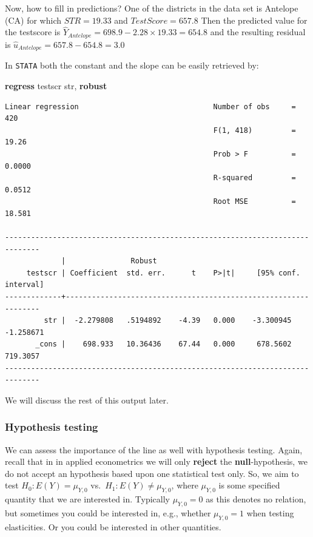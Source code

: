 \documentclass[
]{book}
\newenvironment{Shaded}{\begin{snugshade}}{\end{snugshade}}
\newcommand{\KeywordTok}[1]{\textcolor[rgb]{0.13,0.29,0.53}{\textbf{#1}}}
\newcommand{\NormalTok}[1]{#1}
\begin{document}
Now, how to fill in predictions? One of the districts in the data set is Antelope (CA) for which \(STR = 19.33\) and \(TestScore = 657.8\) Then the predicted value for the testscore is \(\hat{Y}_{Antelope}= 698.9 - 2.28 \times 19.33 = 654.8\) and the resulting residual is \(\hat{u}_{Antelope} = 657.8 - 654.8 = 3.0\)

In \texttt{STATA} both the constant and the slope can be easily retrieved by:

\begin{Shaded}
\begin{Highlighting}[]
\KeywordTok{regress}\NormalTok{ testscr str, }\KeywordTok{robust}
\end{Highlighting}
\end{Shaded}

\begin{verbatim}
Linear regression                               Number of obs     =        420
                                                F(1, 418)         =      19.26
                                                Prob > F          =     0.0000
                                                R-squared         =     0.0512
                                                Root MSE          =     18.581

------------------------------------------------------------------------------
             |               Robust
     testscr | Coefficient  std. err.      t    P>|t|     [95% conf. interval]
-------------+----------------------------------------------------------------
         str |  -2.279808   .5194892    -4.39   0.000    -3.300945   -1.258671
       _cons |    698.933   10.36436    67.44   0.000     678.5602    719.3057
------------------------------------------------------------------------------
\end{verbatim}

We will discuss the rest of this output later.

\hypertarget{sec:unitesting}{%
\subsubsection{Hypothesis testing}\label{sec:unitesting}}

We can assess the importance of the line as well with hypothesis testing. Again, recall that in in applied econometrics we will only \textbf{reject} the \textbf{null}-hypothesis, we do not accept an hypothesis based upon one statistical test only. So, we aim to test \(H_0: E(Y) = \mu_{Y,0}\) vs.~\(H_1: E(Y) \neq \mu_{Y,0}\), where \(\mu_{Y,0}\) is some specified quantity that we are interested in. Typically \(\mu_{Y,0} = 0\) as this denotes no relation, but sometimes you could be interested in, e.g., whether \(\mu_{Y,0} = 1\) when testing elasticities. Or you could be interested in other quantities.
\end{document}
